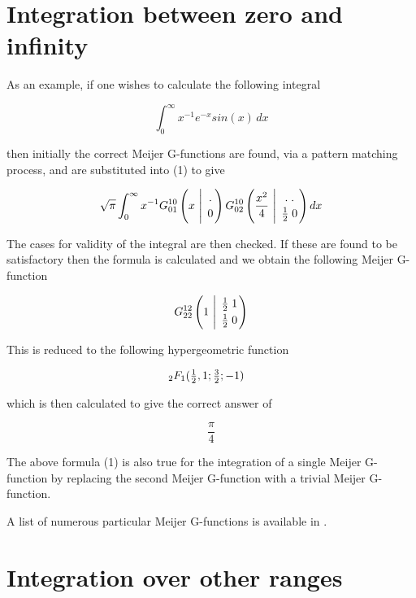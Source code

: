 \section{Integration between zero and infinity}

As an example, if one wishes to calculate the following integral

\begin{displaymath}
\int_{0}^{\infty} x^{-1} e^{-x} sin(x) \, dx
\end{displaymath}

then initially the  correct Meijer G-functions are found, via a
pattern matching
process, and are substituted into (1) to give

\begin{displaymath}
\sqrt{\pi} \int_{0}^{\infty} x^{-1} G^{1 0}_{0 1} \left(x
\ \Bigg\vert \
{. \atop 0}\right) G^{1 0}_{0 2}\left(\frac{x^{2}}{4}
\ \Bigg\vert \ {. \; .  \atop \frac{1}{2} \; 0} \right) dx
\end{displaymath}

The cases for validity of the integral are then checked. If these
are found to be satisfactory then the formula is calculated and we
obtain the following Meijer G-function

\begin{displaymath}
G^{1 2}_{2 2} \left(1 \ \Bigg\vert \ {\frac{1}{2} \; 1 \atop
\frac{1}{2} \; 0} \right)
\end{displaymath}

This is reduced to the following hypergeometric function

\begin{math}
\hspace{50mm} _2F_1 (\frac{1}{2},1;\frac{3}{2};-1 )
\end{math}

which is then calculated to give the correct answer of

\begin{displaymath}
\frac{\pi}{4}
\end{displaymath}

The above formula (1) is also true for the integration of a single
Meijer G-function by replacing the second Meijer G-function
with a trivial Meijer G-function.

A list of numerous particular Meijer G-functions is available in
\cite {Prudnikov}.

\section{Integration over other ranges}

